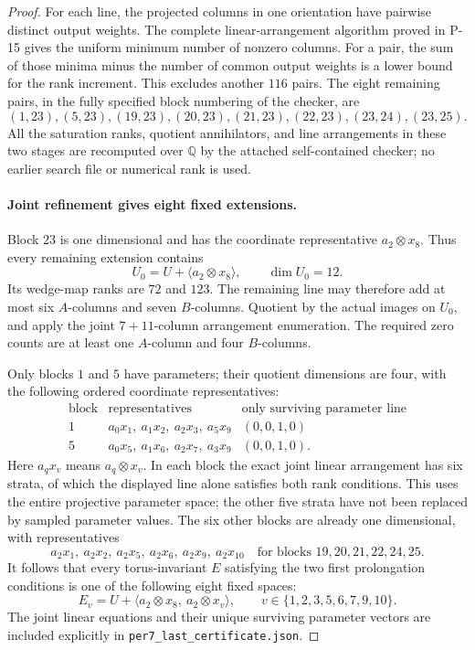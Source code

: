 \begin{proof}
For each line, the projected columns in one orientation have pairwise
distinct output weights.  The complete linear-arrangement algorithm
proved in P-15 gives the uniform minimum number of nonzero columns.
For a pair, the sum of those minima minus the number of common output
weights is a lower bound for the rank increment.  This excludes another
$116$ pairs.  The eight remaining pairs, in the fully specified block
numbering of the checker, are
\[
 (1,23),(5,23),(19,23),(20,23),(21,23),(22,23),(23,24),(23,25).
\]
All the saturation ranks, quotient annihilators, and line arrangements
in these two stages are recomputed over $\mathbb Q$ by the attached
self-contained checker; no earlier search file or numerical rank is
used.

\paragraph{Joint refinement gives eight fixed extensions.}
Block $23$ is one dimensional and has the coordinate representative
$a_2\otimes x_8$.  Thus every remaining extension contains
\[
 U_0=U+\langle a_2\otimes x_8\rangle,\qquad \dim U_0=12.
\]
Its wedge-map ranks are $72$ and $123$.  The remaining line may
therefore add at most six $A$-columns and seven $B$-columns.
Quotient by the actual images on $U_0$, and apply the joint
$7+11$-column arrangement enumeration.  The required zero counts are
at least one $A$-column and four $B$-columns.

Only blocks $1$ and $5$ have parameters; their quotient dimensions
are four, with the following ordered coordinate representatives:
\[
\begin{array}{c|l|c}
 \text{block}&\text{representatives}&\text{only surviving parameter line}\\\hline
 1&a_0x_1,\ a_1x_2,\ a_2x_3,\ a_5x_9&(0,0,1,0)\\
 5&a_0x_5,\ a_1x_6,\ a_2x_7,\ a_3x_9&(0,0,1,0).
\end{array}
\]
Here $a_qx_v$ means $a_q\otimes x_v$.  In each block the exact joint
linear arrangement has six strata, of which the displayed line alone
satisfies both rank conditions.  This uses the entire projective
parameter space; the other five strata have not been replaced by
sampled parameter values.  The six other blocks are already one
dimensional, with representatives
\[
 a_2x_1,\ a_2x_2,\ a_2x_5,\ a_2x_6,\ a_2x_9,\ a_2x_{10}
 \quad\text{for blocks }19,20,21,22,24,25.
\]
It follows that every torus-invariant $E$ satisfying the two first
prolongation conditions is one of the following eight fixed spaces:
\begin{equation}
 E_v=U+\langle a_2\otimes x_8,\ a_2\otimes x_v\rangle,\qquad
 v\in\{1,2,3,5,6,7,9,10\}.
 \label{eq:P19-eight}
\end{equation}
The joint linear equations and their unique surviving parameter
vectors are included explicitly in \texttt{per7\_last\_certificate.json}.


\end{proof}
